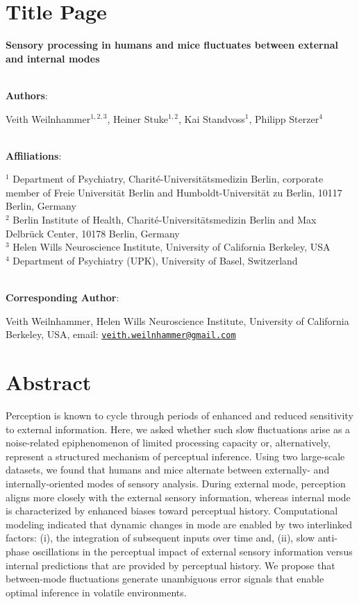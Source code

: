 \documentclass[
]{article}
\author{}
\date{\vspace{-2.5em}}
\begin{document}
\hypertarget{title-page}{%
\section{Title Page}\label{title-page}}

\textbf{Sensory processing in humans and mice fluctuates between
external and internal modes}\\
\strut \\

\textbf{Authors}:

Veith Weilnhammer\(^{1,2, 3}\), Heiner Stuke\(^{1,2}\), Kai
Standvoss\(^{1}\), Philipp Sterzer\(^{4}\)\\
\strut \\
\textbf{Affiliations}:

\(^{1}\) Department of Psychiatry, Charité-Universitätsmedizin Berlin,
corporate member of Freie Universität Berlin and Humboldt-Universität zu
Berlin, 10117 Berlin, Germany\\
\(^{2}\) Berlin Institute of Health, Charité-Universitätsmedizin Berlin
and Max Delbrück Center, 10178 Berlin, Germany\\
\(^{3}\) Helen Wills Neuroscience Institute, University of California
Berkeley, USA\\
\(^{4}\) Department of Psychiatry (UPK), University of Basel,
Switzerland\\
\strut \\

\textbf{Corresponding Author}:

Veith Weilnhammer, Helen Wills Neuroscience Institute, University of
California Berkeley, USA, email:
\href{mailto:veith.weilnhammer@gmail.com}{\nolinkurl{veith.weilnhammer@gmail.com}}\\

\newpage

\hypertarget{abstract}{%
\section{Abstract}\label{abstract}}

Perception is known to cycle through periods of enhanced and reduced
sensitivity to external information. Here, we asked whether such slow
fluctuations arise as a noise-related epiphenomenon of limited
processing capacity or, alternatively, represent a structured mechanism
of perceptual inference. Using two large-scale datasets, we found that
humans and mice alternate between externally- and internally-oriented
modes of sensory analysis. During external mode, perception aligns more
closely with the external sensory information, whereas internal mode is
characterized by enhanced biases toward perceptual history.
Computational modeling indicated that dynamic changes in mode are
enabled by two interlinked factors: (i), the integration of subsequent
inputs over time and, (ii), slow anti-phase oscillations in the
perceptual impact of external sensory information versus internal
predictions that are provided by perceptual history. We propose that
between-mode fluctuations generate unambiguous error signals that enable
optimal inference in volatile environments.
\end{document}

